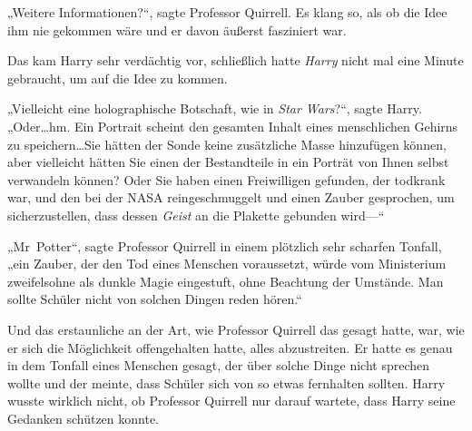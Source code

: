 „Weitere Informationen?“, sagte Professor Quirrell. Es klang so, als ob die Idee ihm nie gekommen wäre und er davon äußerst fasziniert war.

Das kam Harry sehr verdächtig vor, schließlich hatte \emph{Harry} nicht mal eine Minute gebraucht, um auf die Idee zu kommen.

„Vielleicht eine holographische Botschaft, wie in \emph{Star Wars}?“, sagte Harry. „Oder…hm. Ein Portrait scheint den gesamten Inhalt eines menschlichen Gehirns zu speichern…Sie hätten der Sonde keine zusätzliche Masse hinzufügen können, aber vielleicht hätten Sie einen der Bestandteile in ein Porträt von Ihnen selbst verwandeln können? Oder Sie haben einen Freiwilligen gefunden, der todkrank war, und den bei der NASA reingeschmuggelt und einen Zauber gesprochen, um sicherzustellen, dass dessen \emph{Geist} an die Plakette gebunden wird—“

„Mr~Potter“, sagte Professor Quirrell in einem plötzlich sehr scharfen Tonfall, „ein Zauber, der den Tod eines Menschen voraussetzt, würde vom Ministerium zweifelsohne als dunkle Magie eingestuft, ohne Beachtung der Umstände. Man sollte Schüler nicht von solchen Dingen reden hören.“

Und das erstaunliche an der Art, wie Professor Quirrell das gesagt hatte, war, wie er sich die Möglichkeit offengehalten hatte, alles abzustreiten. Er hatte es genau in dem Tonfall eines Menschen gesagt, der über solche Dinge nicht sprechen wollte und der meinte, dass Schüler sich von so etwas fernhalten sollten. Harry wusste wirklich nicht, ob Professor Quirrell nur darauf wartete, dass Harry seine Gedanken schützen konnte.

